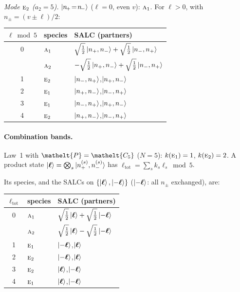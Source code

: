 \documentclass[11pt]{article}
\newcommand{\eltfont}[1]{{\let\sigma\eltsigma\mathelt{#1}}}
\newcommand{\irr}[1]{\text{\normalfont\scshape #1}}
\newcommand{\elt}[1]{\eltfont{#1}}
\newcommand{\pel}{\elt{P}}             %
\begin{document}
\emph{Mode $\irr{e}_{2}$ ($a_2=5$).} $\ket{n_{\!+}\!=\!n_{\!-}}$ ($\ell=0$, even $v$): $\irr{a}_{1}$. For $\ell>0$, with $n_\pm=(v\pm\ell)/2$:
\begin{longtable}{c l l}\hline $\ell\bmod 5$ & species & SALC (partners)\\ \hline\endhead
0 & $\irr{a}_{1}$ & $\sqrt{\tfrac{1}{2}}\ket{n_+,n_-}+\sqrt{\tfrac{1}{2}}\ket{n_-,n_+}$\\
 & $\irr{a}_{2}$ & $-\sqrt{\tfrac{1}{2}}\ket{n_+,n_-}+\sqrt{\tfrac{1}{2}}\ket{n_-,n_+}$\\
1 & $\irr{e}_{2}$ & $\ket{n_-,n_+}$,\quad $\ket{n_+,n_-}$\\
2 & $\irr{e}_{1}$ & $\ket{n_+,n_-}$,\quad $\ket{n_-,n_+}$\\
3 & $\irr{e}_{1}$ & $\ket{n_-,n_+}$,\quad $\ket{n_+,n_-}$\\
4 & $\irr{e}_{2}$ & $\ket{n_+,n_-}$,\quad $\ket{n_-,n_+}$\\
\hline\end{longtable}

\paragraph{Combination bands.}

Law~1 with $\pel=\elt{C_{5}}$ ($N=5$): $k(\irr{e}_{1})=1$, $k(\irr{e}_{2})=2$. A product state $\ket{\boldsymbol\ell}=\bigotimes_s\ket{n_+^{(s)},n_-^{(s)}}$ has $\ell_{\mathrm{tot}}=\sum_sk_s\ell_s\bmod 5$.

Its species, and the SALCs on $\{\ket{\boldsymbol\ell},\ket{-\boldsymbol\ell}\}$ ($\ket{-\boldsymbol\ell}$: all $n_\pm$ exchanged), are:

\begin{longtable}{c l l}\hline $\ell_{\mathrm{tot}}$ & species & SALC (partners)\\ \hline\endhead

0 & $\irr{a}_{1}$ & $\sqrt{\tfrac{1}{2}}\ket{\boldsymbol\ell}+\sqrt{\tfrac{1}{2}}\ket{-\boldsymbol\ell}$\\

 & $\irr{a}_{2}$ & $\sqrt{\tfrac{1}{2}}\ket{\boldsymbol\ell}-\sqrt{\tfrac{1}{2}}\ket{-\boldsymbol\ell}$\\

1 & $\irr{e}_{1}$ & $\ket{-\boldsymbol\ell}$,\quad $\ket{\boldsymbol\ell}$\\

2 & $\irr{e}_{2}$ & $\ket{-\boldsymbol\ell}$,\quad $\ket{\boldsymbol\ell}$\\

3 & $\irr{e}_{2}$ & $\ket{\boldsymbol\ell}$,\quad $\ket{-\boldsymbol\ell}$\\

4 & $\irr{e}_{1}$ & $\ket{\boldsymbol\ell}$,\quad $\ket{-\boldsymbol\ell}$\\

\hline\end{longtable}
\end{document}
